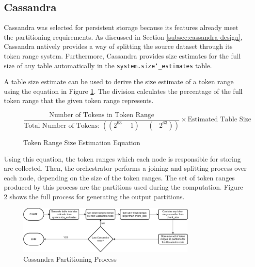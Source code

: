 \subsection{Cassandra}
Cassandra was selected for persistent storage because its features already meet the partitioning requirements. As discussed in Section \ref{subsec:cassandra-design}, Cassandra natively provides a way of splitting the source dataset through its token range system. Furthermore, Cassandra provides size estimates for the full size of any table automatically in the \texttt{system.size\char`_estimates} table.


A table size estimate can be used to derive the size estimate of a token range using the equation in Figure \ref{fig:token-range-estimation}. The division calculates the percentage of the full token range that the given token range represents.

\begin{figure}[h]
	\centering
	\[ \frac{\text{Number of Tokens in Token Range}}{\text{Total Number of Tokens: } ((2^{63}-1) - (-2^{63}))} \times \text{Estimated Table Size} \]
	\caption{Token Range Size Estimation Equation}
	\label{fig:token-range-estimation}
\end{figure}

Using this equation, the token ranges which each node is responsible for storing are collected. Then, the orchestrator performs a joining and splitting process over each node, depending on the size of the token ranges. The set of token ranges produced by this process are the partitions used during the computation. Figure \ref{fig:cassandra-partitioning-decision-tree} shows the full process for generating the output partitions.

\begin{figure}[h]
	\centering
	\includegraphics[width=0.8\textwidth]{chapters/diagrams/implementation/cassandra-partitioning-decision-tree}
	\caption{Cassandra Partitioning Process}
	\label{fig:cassandra-partitioning-decision-tree}
\end{figure}


